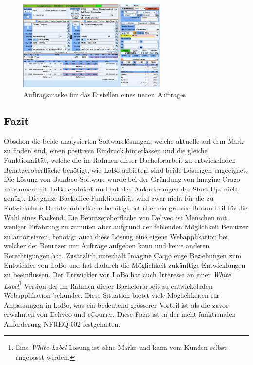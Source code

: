 \begin{figure}[ht]
	\centering
  \includegraphics[width=0.66\textwidth]{images/bambooNew.jpg}
	\caption{Auftragsmaske für das Erstellen eines neuen Auftrages}
	\label{fig1:bamboonew}
\end{figure}

\subsection{Fazit}
Obschon die beide analysierten Softwarelösungen, welche aktuelle auf dem Mark zu finden sind, einen positiven Eindruck hinterlassen und die gleiche Funktionalität, welche die im Rahmen dieser Bachelorarbeit zu entwickelnden Benutzeroberfläche benötigt, wie LoBo anbieten, sind beide Lösungen ungeeignet. Die Lösung von Bamboo-Software wurde bei der Gründung von Imagine Crago zusammen mit LoBo evaluiert und hat den Anforderungen des Start-Ups nicht genügt. Die ganze Backoffice Funktionalität wird zwar nicht für die zu Entwickelnde Benutzeroberfläche benötigt, ist aber ein grosser Bestandteil für die Wahl eines Backend. Die Benutzeroberfläche von Deliveo ist Menschen mit weniger Erfahrung zu zumuten aber aufgrund der fehlenden Möglichkeit Benutzer zu autorisieren, benötigt auch diese Lösung eine eigene Webapplikation bei welcher der Benutzer nur Aufträge aufgeben kann und keine anderen Berechtigungen hat. Zusätzlich unterhält Imagine Cargo enge Beziehungen zum Entwickler von LoBo und hat dadurch die Möglichkeit zukünftige Entwicklungen zu beeinflussen. Der Entwickler von LoBo hat auch Interesse an einer \textit{White Label}\footnote{ Eine \textit{White Label} Lösung ist ohne Marke und kann vom Kunden selbst angepasst werden.} Version der im Rahmen dieser Bachelorarbeit zu entwickelnden Webapplikation bekundet. Diese Situation bietet viele Möglichkeiten für Anpassungen in LoBo, was ein bedeutend grösserer Vorteil ist als die zuvor erwähnten von Deliveo und eCourier. Diese Fazit ist in der nicht funktionalen Anforderung NFREQ-002 festgehalten.